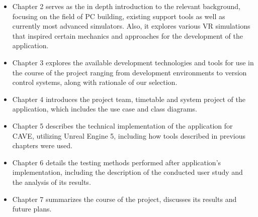 \begin{itemize}
    \item Chapter 2 serves as the in depth introduction to the relevant background, focusing on the field of PC building, existing support tools as well as currently most advanced simulators. 
    Also, it explores various VR simulations that inspired certain mechanics and approaches for the development of the application.

    \item Chapter 3 explores the available development technologies and tools for use in the course of the project ranging from development environments to version control systems, along with rationale of our selection.

    \item Chapter 4 introduces the project team, timetable and system project of the application, which includes the use case and class diagrams.
    
    \item Chapter 5 describes the technical implementation of the application for CAVE, utilizing Unreal Engine 5, including how tools described in previous chapters were used.
    
    \item Chapter 6 details the testing methods performed after application's implementation, including the description of the conducted user study and the analysis of its results.

    \item Chapter 7 summarizes the course of the project, discusses its results and future plans.
     
\end{itemize}
